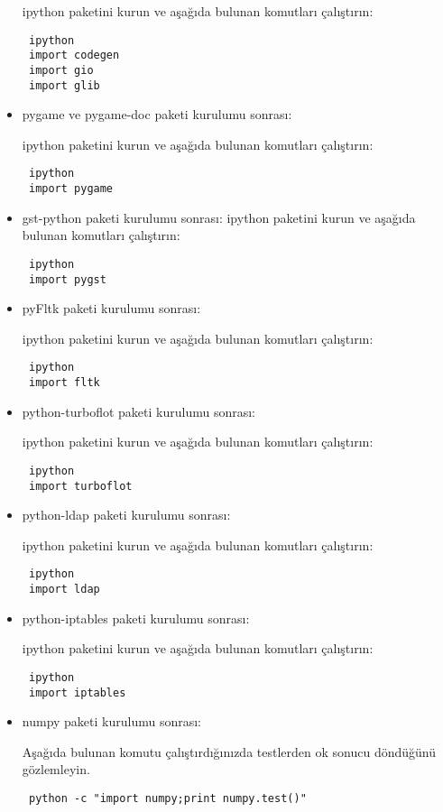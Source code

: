 \documentclass[a4paper,10pt]{article}
\begin{document}
\begin{itemize}
ipython paketini kurun ve aşağıda bulunan komutları çalıştırın:
\begin{verbatim}
 ipython
 import codegen
 import gio
 import glib
\end{verbatim}
\item pygame ve pygame-doc paketi kurulumu sonrası:

ipython paketini kurun ve aşağıda bulunan komutları çalıştırın:
\begin{verbatim}
 ipython
 import pygame
\end{verbatim}

\item gst-python paketi kurulumu sonrası:
ipython paketini kurun ve aşağıda bulunan komutları çalıştırın:
\begin{verbatim}
 ipython
 import pygst
\end{verbatim}

\item pyFltk paketi kurulumu sonrası:

ipython paketini kurun ve aşağıda bulunan komutları çalıştırın:
\begin{verbatim}
 ipython
 import fltk
\end{verbatim}

\item python-turboflot paketi kurulumu sonrası:

ipython paketini kurun ve aşağıda bulunan komutları çalıştırın:
\begin{verbatim}
 ipython
 import turboflot
\end{verbatim}

\item python-ldap paketi kurulumu sonrası:

ipython paketini kurun ve aşağıda bulunan komutları çalıştırın:
\begin{verbatim}
 ipython
 import ldap
\end{verbatim}

\item python-iptables paketi kurulumu sonrası:

ipython paketini kurun ve aşağıda bulunan komutları çalıştırın:
\begin{verbatim}
 ipython
 import iptables
\end{verbatim}

\item numpy paketi kurulumu sonrası:

Aşağıda bulunan komutu çalıştırdığınızda testlerden ok sonucu döndüğünü gözlemleyin.
\begin{verbatim}
 python -c "import numpy;print numpy.test()"
\end{verbatim}


\end{itemize}
\end{document}
